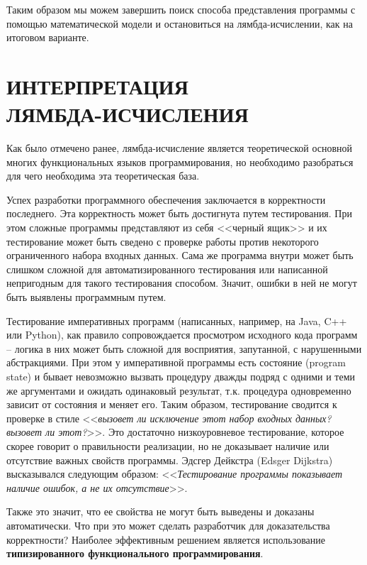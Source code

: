 \documentclass[a4paper,14pt]{extreport} %
\begin{document}
Таким образом мы можем завершить поиск способа представления программы с помощью математической модели и остановиться на лямбда-исчислении, как на итоговом варианте.


\newpage

\section[ИНТЕРПРЕТАЦИЯ ЛЯМБДА-ИСЧИСЛЕНИЯ]{ИНТЕРПРЕТАЦИЯ \\ ЛЯМБДА-ИСЧИСЛЕНИЯ}

Как было отмечено ранее, лямбда-исчисление является теоретической основной многих функциональных языков программирования, но необходимо разобраться для чего необходима эта теоретическая база.

Успех разработки программного обеспечения заключается в корректности последнего. Эта корректность может быть достигнута путем тестирования. При этом сложные программы представляют из себя <<черный ящик>> и их тестирование может быть сведено с проверке работы против некоторого ограниченного набора входных данных. Сама же программа внутри может быть слишком сложной для автоматизированного тестирования или написанной непригодным для такого тестирования способом. Значит, ошибки в ней не могут быть выявлены программным путем.

Тестирование императивных программ (написанных, например, на Java, C++ или Python), как правило сопровождается просмотром исходного кода программ -- логика в них может быть сложной для восприятия, запутанной, с нарушенными абстракциями. При этом у императивной программы есть состояние (program state) и бывает невозможно вызвать процедуру дважды подряд с одними и теми же аргументами и ожидать одинаковый результат, т.к. процедура одновременно зависит от состояния и меняет его. Таким образом, тестирование сводится к проверке в стиле <<\textit{вызовет ли исключение этот набор входных данных? вызовет ли этот?}>>. Это достаточно низкоуровневое тестирование, которое скорее говорит о правильности реализации, но не доказывает наличие или отсутствие важных свойств программы. Эдсгер Дейкстра (Edsger Dijkstra) высказывался следующим образом: <<\textit{Тестирование программы показывает наличие ошибок, а не их отсутствие}>>.

Также это значит, что ее свойства не могут быть выведены и доказаны автоматически. Что при это может сделать разработчик для доказательства корректности? Наиболее эффективным решением является использование \textbf{типизированного функционального программирования}.
\end{document}

